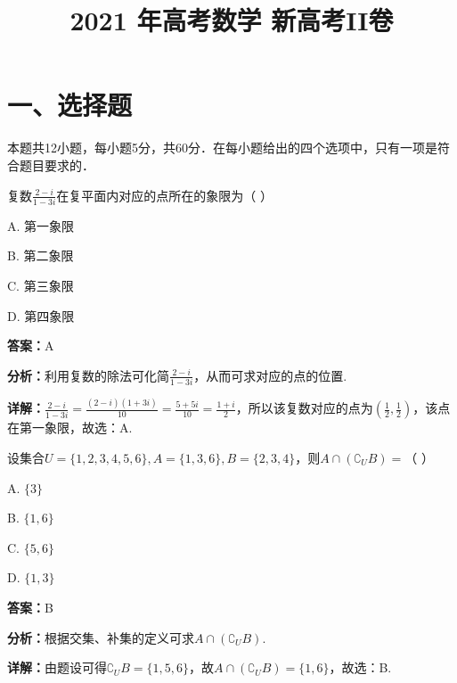 ﻿\title{2021 年高考数学 新高考II卷}
\date{}
\maketitle

\section*{一、选择题}
本题共12小题，每小题5分，共60分．在每小题给出的四个选项中，只有一项是符合题目要求的．

\begin{question}[points=5]
复数$\frac{2-i}{1-3i}$在复平面内对应的点所在的象限为（ ）
\begin{choices}
  \item A. 第一象限
  \item B. 第二象限
  \item C. 第三象限
  \item D. 第四象限
\end{choices}
\begin{solution}
\textbf{答案：}A

\textbf{分析：}利用复数的除法可化简$\frac{2-i}{1-3i}$，从而可求对应的点的位置.

\textbf{详解：}$\frac{2-i}{1-3i}=\frac{(2-i)(1+3i)}{10}=\frac{5+5i}{10}=\frac{1+i}{2}$，所以该复数对应的点为$(\frac{1}{2},\frac{1}{2})$，该点在第一象限，故选：A.
\end{solution}
\end{question}

\begin{question}[points=5]
设集合$U=\{1,2,3,4,5,6\},A=\{1,3,6\},B=\{2,3,4\}$，则$A\cap(\complement_U B)=$（ ）
\begin{choices}
  \item A. $\{3\}$
  \item B. $\{1,6\}$
  \item C. $\{5,6\}$
  \item D. $\{1,3\}$
\end{choices}
\begin{solution}
\textbf{答案：}B

\textbf{分析：}根据交集、补集的定义可求$A\cap(\complement_U B)$.

\textbf{详解：}由题设可得$\complement_U B=\{1,5,6\}$，故$A\cap(\complement_U B)=\{1,6\}$，故选：B.
\end{solution}
\end{question}

